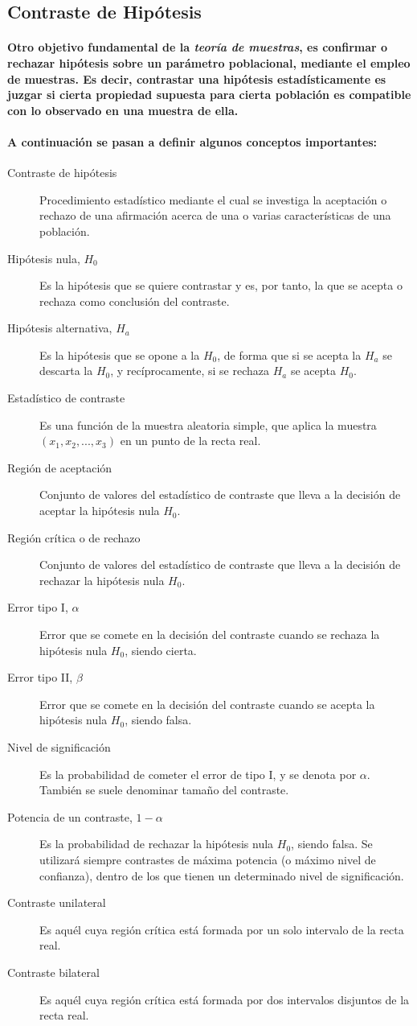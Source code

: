 \subsection{Contraste de Hipótesis}
\paragraph{
Otro objetivo fundamental de la \emph{teoría de muestras}, es confirmar o rechazar hipótesis sobre un parámetro poblacional, mediante el empleo de muestras. Es decir, contrastar una hipótesis estadísticamente es juzgar si cierta propiedad supuesta para cierta población es compatible con lo observado en una muestra de ella.
}
\paragraph{
A continuación se pasan a definir algunos conceptos importantes:
}
\begin{description}
\item[Contraste de hipótesis] Procedimiento estadístico mediante el cual se investiga la aceptación o rechazo de una afirmación acerca de una o varias características de una población.
\item[Hipótesis nula, $H_0$] Es la hipótesis que se quiere contrastar y es, por tanto, la que se acepta o rechaza como conclusión del contraste.
\item[Hipótesis alternativa, $H_a$] Es la hipótesis que se opone a la $H_0$, de forma que si se acepta la $H_a$ se descarta la $H_0$, y recíprocamente, si se rechaza $H_a$ se acepta $H_0$.
\item[Estadístico de contraste] Es una función de la muestra aleatoria simple, que aplica la muestra $(x_1,x_2,...,x_3)$ en un punto de la recta real.
\item[Región de aceptación] Conjunto de valores del estadístico de contraste que lleva a la decisión de aceptar la hipótesis nula $H_0$.
\item[Región crítica o de rechazo] Conjunto de valores del estadístico de contraste que lleva a la decisión de rechazar la hipótesis nula $H_0$.
\item[Error tipo I, $\alpha$] Error que se comete en la decisión del contraste cuando se rechaza la hipótesis nula $H_0$, siendo cierta.
\item[Error tipo II, $\beta$] Error que se comete en la decisión del contraste cuando se acepta la hipótesis nula $H_0$, siendo falsa.
\item[Nivel de significación] Es la probabilidad de cometer el error de tipo I, y se denota por $\alpha$. También se suele denominar tamaño del contraste.
\item[Potencia de un contraste, $1-\alpha$] Es la probabilidad de rechazar la hipótesis nula $H_0$, siendo falsa. Se utilizará siempre contrastes de máxima potencia (o máximo nivel de confianza), dentro de los que tienen un determinado nivel de significación.
\item[Contraste unilateral] Es aquél cuya región crítica está formada por un solo intervalo de la recta real.
\item[Contraste bilateral] Es aquél cuya región crítica está formada por dos intervalos disjuntos de la recta real.
\end{description}
